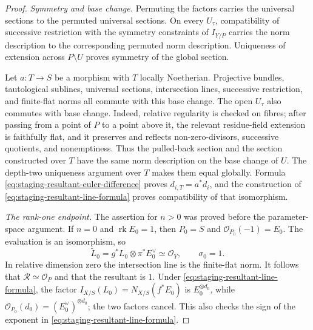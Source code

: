 \begin{proof}
\medskip
\noindent\emph{Symmetry and base change.}
Permuting the factors carries the universal sections to the permuted
universal sections.  On every \(U_\tau\), compatibility of successive
restriction with the symmetry constraints of \(I_{Y/P}\) carries the norm
description to the corresponding permuted norm description.  Uniqueness
of extension across \(P\setminus U\) proves symmetry of the global
section.

Let \(a\colon T\to S\) be a morphism with \(T\) locally Noetherian.  Projective
bundles, tautological sublines, universal sections, intersection lines,
successive restriction, and finite-flat norms all commute with this base
change.  The open \(U_\tau\) also commutes with base change.  Indeed,
relative regularity is checked on fibres; after passing from a point of
\(P\) to a point above it, the relevant residue-field extension is
faithfully flat, and it preserves and reflects non-zero-divisors,
successive quotients, and nonemptiness.  Thus the pulled-back section and
the section constructed over \(T\) have the same norm description on the
base change of \(U\).  The depth-two uniqueness argument over \(T\) makes
them equal globally.  Formula
\eqref{eq:staging-resultant-euler-difference} proves
\(d_{i,T}=a^*d_i\), and the construction of
\eqref{eq:staging-resultant-line-formula} proves compatibility of that
isomorphism.

\medskip
\noindent\emph{The rank-one endpoint.}
The assertion for \(n>0\) was proved before the parameter-space argument.
If \(n=0\) and \(\operatorname{rk}E_0=1\), then \(P_0=S\) and
\(\mathcal O_{P_0}(-1)=E_0\).  The evaluation is an isomorphism, so
\[
 \widetilde L_0
 =
 g^*L_0\otimes\pi^*E_0^\vee
 \simeq\mathcal O_Y,
 \qquad
 \sigma_0=1.
\]
In relative dimension zero the intersection line is the finite-flat norm.
It follows that \(\mathscr R\simeq\mathcal O_P\) and that the resultant is
\(1\).  Under \eqref{eq:staging-resultant-line-formula}, the factor
\(I_{X/S}(L_0)=N_{X/S}(f^*E_0)\) is
\(E_0^{\otimes d_0}\), while
\(\mathcal O_{P_0}(d_0)=(E_0^\vee)^{\otimes d_0}\); the two factors cancel.
This also checks the sign of the exponent in
\eqref{eq:staging-resultant-line-formula}.
\end{proof}

